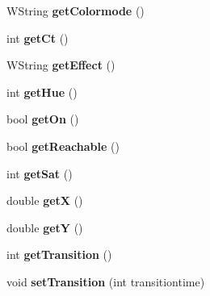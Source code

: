 \begin{DoxyCompactItemize}
\item 
W\+String {\bfseries get\+Colormode} ()\hypertarget{classLight_a86035531e072198215c93e209a9e1b26}{}\label{classLight_a86035531e072198215c93e209a9e1b26}

\item 
int {\bfseries get\+Ct} ()\hypertarget{classLight_ad85ac2204e21ccfb8de2629e9d06522e}{}\label{classLight_ad85ac2204e21ccfb8de2629e9d06522e}

\item 
W\+String {\bfseries get\+Effect} ()\hypertarget{classLight_ace681f751dc58d5765681b0c6dd5b7d8}{}\label{classLight_ace681f751dc58d5765681b0c6dd5b7d8}

\item 
int {\bfseries get\+Hue} ()\hypertarget{classLight_a231f7c7f3af266a8546cfa1eafa18742}{}\label{classLight_a231f7c7f3af266a8546cfa1eafa18742}

\item 
bool {\bfseries get\+On} ()\hypertarget{classLight_a853a20a23503b56aeb0176c42a45e30b}{}\label{classLight_a853a20a23503b56aeb0176c42a45e30b}

\item 
bool {\bfseries get\+Reachable} ()\hypertarget{classLight_aee4545509a49fddb3c149fe9376a655a}{}\label{classLight_aee4545509a49fddb3c149fe9376a655a}

\item 
int {\bfseries get\+Sat} ()\hypertarget{classLight_acd36cc5de77a20fb9e5598eda6115d1c}{}\label{classLight_acd36cc5de77a20fb9e5598eda6115d1c}

\item 
double {\bfseries getX} ()\hypertarget{classLight_a401f5a447322029577f1040188538c6c}{}\label{classLight_a401f5a447322029577f1040188538c6c}

\item 
double {\bfseries getY} ()\hypertarget{classLight_ac61ce140a5a281129a06bf1eff84152f}{}\label{classLight_ac61ce140a5a281129a06bf1eff84152f}

\item 
int {\bfseries get\+Transition} ()\hypertarget{classLight_a29a510ed9a2c08aef7d5fbc8cf2339e6}{}\label{classLight_a29a510ed9a2c08aef7d5fbc8cf2339e6}

\item 
void {\bfseries set\+Transition} (int transitiontime)\hypertarget{classLight_a517850ab2cf4a1584f2bb4ffc75c17e7}{}\label{classLight_a517850ab2cf4a1584f2bb4ffc75c17e7}

\end{DoxyCompactItemize}
